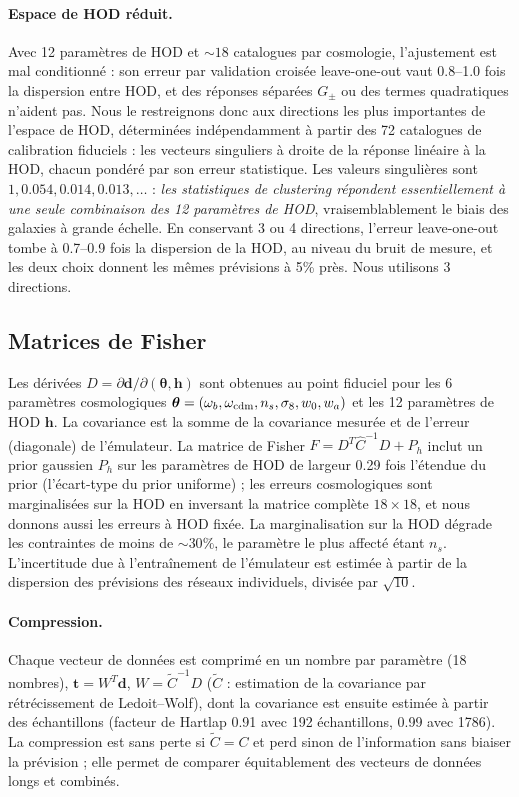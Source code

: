 \documentclass[11pt,twocolumn]{article}
\begin{document}
\paragraph{Espace de HOD réduit.} Avec 12 paramètres de HOD et $\sim18$ catalogues par cosmologie, l'ajustement est mal conditionné : son erreur par validation croisée leave-one-out vaut 0.8--1.0 fois la dispersion entre HOD, et des réponses séparées $G_\pm$ ou des termes quadratiques n'aident pas. Nous le restreignons donc aux directions les plus importantes de l'espace de HOD, déterminées indépendamment à partir des 72 catalogues de calibration fiduciels : les vecteurs singuliers à droite de la réponse linéaire à la HOD, chacun pondéré par son erreur statistique. Les valeurs singulières sont $1, 0.054, 0.014, 0.013,\dots$ : \emph{les statistiques de clustering répondent essentiellement à une seule combinaison des 12 paramètres de HOD}, vraisemblablement le biais des galaxies à grande échelle. En conservant 3 ou 4 directions, l'erreur leave-one-out tombe à 0.7--0.9 fois la dispersion de la HOD, au niveau du bruit de mesure, et les deux choix donnent les mêmes prévisions à 5\% près. Nous utilisons 3 directions.

\subsection{Matrices de Fisher}
\label{sec:fishermat}

Les dérivées $D=\partial\boldsymbol d/\partial(\boldsymbol\theta,\boldsymbol h)$ sont obtenues au point fiduciel pour les 6 paramètres cosmologiques $\boldsymbol\theta=(\omega_b,\omega_{\rm cdm},n_s,\sigma_8,w_0,w_a)$ et les 12 paramètres de HOD $\boldsymbol h$. La covariance est la somme de la covariance mesurée et de l'erreur (diagonale) de l'émulateur. La matrice de Fisher $F = D^T\hat C^{-1}D + P_h$ inclut un prior gaussien $P_h$ sur les paramètres de HOD de largeur 0.29 fois l'étendue du prior (l'écart-type du prior uniforme) ; les erreurs cosmologiques sont marginalisées sur la HOD en inversant la matrice complète $18\times18$, et nous donnons aussi les erreurs à HOD fixée. La marginalisation sur la HOD dégrade les contraintes de moins de $\sim30\%$, le paramètre le plus affecté étant $n_s$. L'incertitude due à l'entraînement de l'émulateur est estimée à partir de la dispersion des prévisions des réseaux individuels, divisée par $\sqrt{10}$.

\paragraph{Compression.} Chaque vecteur de données est comprimé en un nombre par paramètre (18 nombres), $\boldsymbol t=W^T\boldsymbol d$, $W=\tilde C^{-1}D$ ($\tilde C$ : estimation de la covariance par rétrécissement de Ledoit--Wolf), dont la covariance est ensuite estimée à partir des échantillons (facteur de Hartlap 0.91 avec 192 échantillons, 0.99 avec 1786). La compression est sans perte si $\tilde C=C$ et perd sinon de l'information sans biaiser la prévision ; elle permet de comparer équitablement des vecteurs de données longs et combinés.
\end{document}
